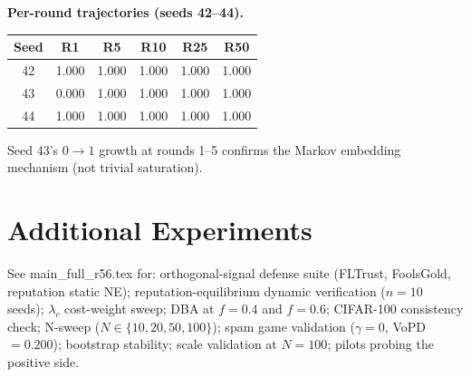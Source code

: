\documentclass{article}
\begin{document}
\textbf{Per-round trajectories (seeds 42--44).}
\begin{center}\small
\begin{tabular}{c|ccccc}
\toprule
Seed & R1 & R5 & R10 & R25 & R50 \\
\midrule
42 & 1.000 & 1.000 & 1.000 & 1.000 & 1.000 \\
43 & 0.000 & 1.000 & 1.000 & 1.000 & 1.000 \\
44 & 1.000 & 1.000 & 1.000 & 1.000 & 1.000 \\
\bottomrule
\end{tabular}
\end{center}
Seed 43's $0\to1$ growth at rounds 1--5 confirms the Markov embedding mechanism (not trivial saturation).

\section{Additional Experiments}
\label{app:additional}
See main\_full\_r56.tex for: orthogonal-signal defense suite (FLTrust, FoolsGold, reputation static NE); reputation-equilibrium dynamic verification ($n=10$ seeds); $\lambda_c$ cost-weight sweep; DBA at $f=0.4$ and $f=0.6$; CIFAR-100 consistency check; N-sweep ($N\in\{10,20,50,100\}$); spam game validation ($\gamma=0$, VoPD $=0.200$); bootstrap stability; scale validation at $N=100$; pilots probing the positive side.
\end{document}
